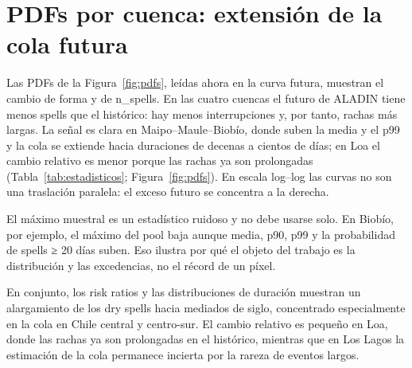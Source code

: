 \section{PDFs por cuenca: extensión de la cola futura}\label{sec:pdfs_fut}

Las PDFs de la Figura~\ref{fig:pdfs}, leídas ahora en la curva futura, muestran el cambio de forma y de n\_spells. En las cuatro cuencas el futuro de ALADIN tiene menos spells que el histórico: hay menos interrupciones y, por tanto, rachas más largas. La señal es clara en Maipo--Maule--Biobío, donde suben la media y el p99 y la cola se extiende hacia duraciones de decenas a cientos de días; en Loa el cambio relativo es menor porque las rachas ya son prolongadas (Tabla~\ref{tab:estadisticos}; Figura~\ref{fig:pdfs}). En escala log--log las curvas no son una traslación paralela: el exceso futuro se concentra a la derecha.

El máximo muestral es un estadístico ruidoso y no debe usarse solo. En Biobío, por ejemplo, el máximo del pool baja aunque media, p90, p99 y la probabilidad de spells ≥ 20 días suben. Eso ilustra por qué el objeto del trabajo es la distribución y las excedencias, no el récord de un píxel.

En conjunto, los risk ratios y las distribuciones de duración muestran un alargamiento de los dry spells hacia mediados de siglo, concentrado especialmente en la cola en Chile central y centro-sur. El cambio relativo es pequeño en Loa, donde las rachas ya son prolongadas en el histórico, mientras que en Los Lagos la estimación de la cola permanece incierta por la rareza de eventos largos.

